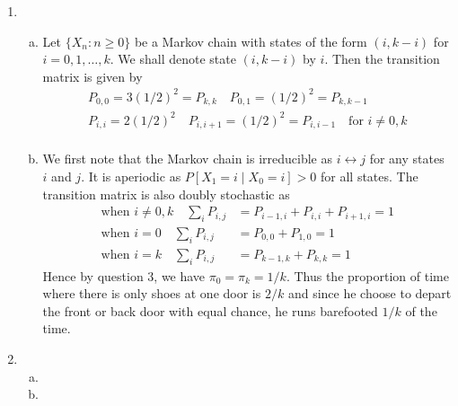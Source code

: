 \documentclass[a4paper,10pt]{article}
\theoremstyle{definition}
\begin{document}
\begin{enumerate}
\begin{enumerate}[(a)]
\item
\item
\end{enumerate}
\item
\begin{enumerate}[(a)]
\item Let $\{X_n:n\geq0\}$ be a Markov chain with states of the form $(i,k-i)$ for $i=0,1,\ldots, k$. We shall denote state $(i,k-i)$ by $i$. Then the transition matrix is given by
\begin{align*}
P_{0,0}=3(1/2)^2=P_{k,k}\quad P_{0,1}=(1/2)^2=P_{k,k-1}\\
P_{i,i}=2(1/2)^2\quad P_{i,i+1}=(1/2)^2=P_{i,i-1}\quad\text{for $i \neq 0, k$}\\
\end{align*}

\item We first note that the Markov chain is irreducible as $i\leftrightarrow j$ for any states $i$ and $j$. It is aperiodic as $P\left[X_1=i\mid X_0=i\right] >0$ for all states. The transition matrix is also doubly stochastic as 
\begin{align*}
\text{when $i \neq 0,k$} \quad\sum_{i}P_{i,j}&=P_{i-1,i}+P_{i,i}+P_{i+1,i}=1  \\
\text{when $i = 0$} \quad \sum_{i}P_{i,j}&=P_{0,0}+P_{1,0}=1  \\
\text{when $i = k$} \quad\sum_{i}P_{i,j}&=P_{k-1,k}+P_{k,k}=1 
\end{align*}
Hence by question 3, we have $\pi_0=\pi_k=1/k$. Thus the proportion of time where there is only shoes at one door is $2/k$ and since he choose to depart the front or back door with equal chance, he runs barefooted $1/k$ of the time.
\end{enumerate}
\item
\begin{enumerate}[(a)]
\item
\item
\end{enumerate}
\end{enumerate}
\end{document}
